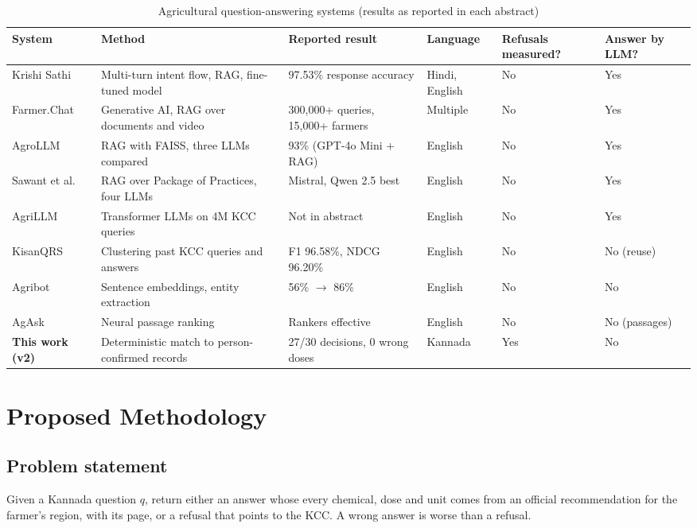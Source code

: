 \documentclass[conference]{IEEEtran}
\begin{document}
\begin{table}[t]
\centering
\caption{Agricultural question-answering systems (results as reported in each abstract)}
\label{tab:lit}
\small
\begin{tabular}{p{2.6cm}p{5.2cm}p{3.6cm}p{1.4cm}p{1.6cm}p{1.2cm}}
\toprule
System & Method & Reported result & Language & Refusals measured? & Answer by LLM?\\
\midrule
Krishi Sathi~\cite{vijayvargia2025krishisathi} & Multi-turn intent flow, RAG, fine-tuned model & 97.53\% response accuracy & Hindi, English & No & Yes\\
Farmer.Chat~\cite{singh2024farmerchat} & Generative AI, RAG over documents and video & 300,000+ queries, 15,000+ farmers & Multiple & No & Yes\\
AgroLLM~\cite{samuel2025agrollm} & RAG with FAISS, three LLMs compared & 93\% (GPT-4o Mini + RAG) & English & No & Yes\\
Sawant et al.~\cite{sawant2026empowering} & RAG over Package of Practices, four LLMs & Mistral, Qwen 2.5 best & English & No & Yes\\
AgriLLM~\cite{didwania2024agrillm} & Transformer LLMs on 4M KCC queries & Not in abstract & English & No & Yes\\
KisanQRS~\cite{rehman2024kisanqrs} & Clustering past KCC queries and answers & F1 96.58\%, NDCG 96.20\% & English & No & No (reuse)\\
Agribot~\cite{jain2025agribot} & Sentence embeddings, entity extraction & 56\% $\rightarrow$ 86\% & English & No & No\\
AgAsk~\cite{koopman2022agask} & Neural passage ranking & Rankers effective & English & No & No (passages)\\
\textbf{This work (v2)} & Deterministic match to person-confirmed records & 27/30 decisions, 0 wrong doses & Kannada & Yes & No\\
\bottomrule
\end{tabular}
\end{table}

\section{Proposed Methodology}

\subsection{Problem statement}
Given a Kannada question $q$, return either an answer whose every chemical, dose and unit
comes from an official recommendation for the farmer's region, with its page, or a refusal
that points to the KCC. A wrong answer is worse than a refusal.
\end{document}
